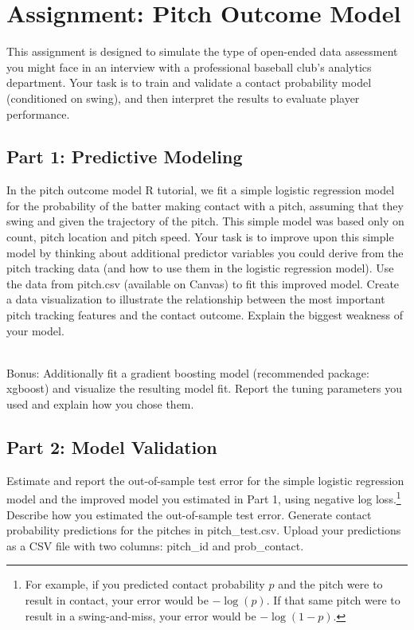 \documentclass{article}
\begin{document}
  \section*{\sc Assignment: Pitch Outcome Model}

    This assignment is designed to simulate the type of open-ended data assessment you might face in an interview with a professional baseball club's analytics department. Your task is to train and validate a contact probability model (conditioned on swing), and then interpret the results to evaluate player performance.
    
    \subsection*{\sc Part 1: Predictive Modeling}

      In the pitch outcome model R tutorial, we fit a simple logistic regression model for the probability of the batter making contact with a pitch, assuming that they swing and given the trajectory of the pitch. This simple model was based only on count, pitch location and pitch speed. Your task is to improve upon this simple model by thinking about additional predictor variables you could derive from the pitch tracking data (and how to use them in the logistic regression model). Use the data from pitch.csv (available on Canvas) to fit this improved model. Create a data visualization to illustrate the relationship between the most important pitch tracking features and the contact outcome. Explain the biggest weakness of your model.

      ~\\
      {\sc Bonus:} Additionally fit a gradient boosting model (recommended package: xgboost) and visualize the resulting model fit. Report the tuning parameters you used and explain how you chose them.

    \subsection*{\sc Part 2: Model Validation}

      Estimate and report the out-of-sample test error for the simple logistic regression model and the improved model you estimated in Part 1, using negative log loss.\footnote{For example, if you predicted contact probability $p$ and the pitch were to result in contact, your error would be $-\log(p)$. If that same pitch were to result in a swing-and-miss, your error would be $-\log(1-p)$.} Describe how you estimated the out-of-sample test error. Generate contact probability predictions for the pitches in pitch\_test.csv. Upload your predictions as a CSV file with two columns: pitch\_id and prob\_contact.
\end{document}
